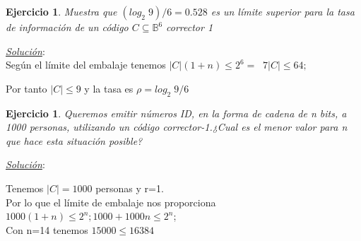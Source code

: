 \documentclass{beamer}
\theoremstyle{plain}
\theoremstyle{example}
\newtheorem{ejercicio} [Ejercicio]{Ejercicio}
\theoremstyle{example}
\begin{document}
\begin{frame}  \small \begin{ejercicio} 
Muestra que $(log_2 \; 9)/6 = 0.528$ es un límite superior para la tasa de información de un código $C\subseteq \mathbb{B}^6$ corrector 1

\end{ejercicio} \textit{\underline{Solución}}:\\ 
\vspace{0.3cm}
Según el límite del embalaje tenemos 
$|C| (1+n) \leq 2^6 = \;\; 7 |C| \leq 64 ;$ 

Por tanto $|C| \leq 9$ y la tasa es $\rho = log_2 \; 9 /6$

\end{frame} 



\begin{frame}  \small \begin{ejercicio} 

Queremos emitir números ID, en la forma de cadena de n bits, a 1000 personas, utilizando un código corrector-1.¿Cual es el menor valor para n que hace esta situación posible? 

\end{ejercicio} 



\textit{\underline{Solución}}:\\ 

\vspace{0.3cm}

Tenemos $|C|=1000$ personas  y r=1.\\
\vspace{0.3cm}
Por lo que el límite de embalaje nos proporciona
$1000 (1+n) \leq 2^n; 1000+1000n \leq 2^n$; \\
\vspace{0.3cm}
Con n=14 tenemos $15000 \leq 16384$


\end{frame} 







\end{document}
